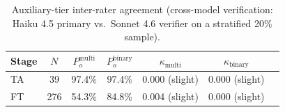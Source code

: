 \begin{table}[htbp]
\centering
\caption{Auxiliary-tier inter-rater agreement (cross-model verification: Haiku 4.5 primary vs.\ Sonnet 4.6 verifier on a stratified 20\% sample).}
\label{tab:aux-kappa-results}
\begin{tabular}{lcccccc}
\toprule
Stage & $N$ & $P_o^{\text{multi}}$ & $P_o^{\text{binary}}$ & $\kappa_{\text{multi}}$ & $\kappa_{\text{binary}}$ \\
\midrule
TA & 39 & 97.4\% & 97.4\% & 0.000 (slight) & 0.000 (slight) \\
FT & 276 & 54.3\% & 84.8\% & 0.004 (slight) & 0.000 (slight) \\
\bottomrule
\end{tabular}
\end{table}